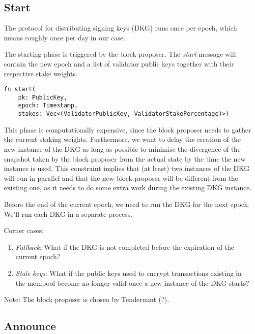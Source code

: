 \documentclass[acmsmall]{acmart}
\numberwithin{figure}{subsection}
\begin{document}


\subsection{Start}

The protocol for distributing signing keys (DKG) runs once per epoch, which means roughly once per day in our case.

The starting phase is triggered by the block proposer. The \textit{start} message will contain the new epoch and a list of validator public keys together with their respective stake weights.
\begin{lstlisting}
fn start(
    pk: PublicKey,
    epoch: Timestamp,
    stakes: Vec<(ValidatorPublicKey, ValidatorStakePercentage)>)
\end{lstlisting}

This phase is computationally expensive, since the block proposer needs to gather the current staking weights. Furthermore, we want to delay the creation of the new instance of the DKG as long as possible to minimise the divergence of the snapshot taken by the block proposer from the actual state by the time the new instance is used. This constraint implies that (at least) two instances of the DKG will run in parallel and that the new block proposer will be different from the existing one, as it needs to do some extra work during the existing DKG instance.

Before the end of the current epoch, we need to run the DKG for the next epoch. We'll run each DKG in a separate process.

Corner cases:
\begin{enumerate}
    \item \textit{Fallback}: What if the DKG is not completed before the expiration of the current epoch?
    \item \textit{Stale keys}: What if the public keys used to encrypt transactions existing in the mempool become no longer valid once a new instance of the DKG starts?
\end{enumerate}

Note: The block proposer is chosen by Tendermint (?).

\subsection{Announce}
\end{document}
